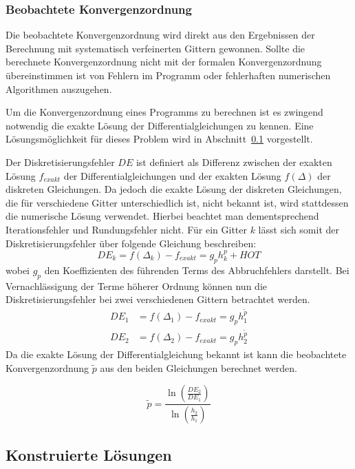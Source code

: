 \subsubsection{Beobachtete Konvergenzordnung}

Die beobachtete Konvergenzordnung wird direkt aus den Ergebnissen der Berechnung mit systematisch
verfeinerten Gittern gewonnen. Sollte die berechnete Konvergenzordnung nicht mit der formalen
Konvergenzordnung übereinstimmen ist von Fehlern im Programm oder fehlerhaften numerischen Algorithmen auszugehen.

Um die Konvergenzordnung eines Programms zu berechnen ist es zwingend notwendig die exakte Lösung der
Differentialgleichungen zu kennen. Eine Lösungsmöglichkeit für dieses Problem wird in Abschnitt~\ref{sec:man_sol}
vorgestellt.

Der Diskretisierungsfehler $DE$ ist definiert als Differenz zwischen der exakten Lösung $f_{exakt}$
der Differentialgleichungen und der exakten Lösung $f(\Delta)$ der diskreten Gleichungen.
Da jedoch die exakte Lösung der diskreten Gleichungen, die für verschiedene Gitter unterschiedlich ist,
nicht bekannt ist, wird stattdessen die numerische Lösung verwendet. Hierbei beachtet man dementsprechend
Iterationsfehler und Rundungsfehler nicht. Für ein Gitter $k$ lässt sich somit der Diskretisierungsfehler
über folgende Gleichung beschreiben:
\begin{equation*}
  DE_k=f(\Delta_k) - f_{exakt} = g_p h_k^p + HOT
\end{equation*}
wobei $g_p$ den Koeffizienten des führenden Terms des Abbruchfehlers darstellt.
Bei Vernachlässigung der Terme höherer Ordnung können nun die Diskretisierungsfehler bei
zwei verschiedenen Gittern betrachtet werden.
\begin{align*}
  DE_1 &= f(\Delta_1) - f_{exakt} = g_p h_1^{\tilde{p}}\\
  DE_2 &= f(\Delta_2) - f_{exakt} = g_p h_2^{\tilde{p}}
\end{align*}
Da die exakte Lösung der Differentialgleichung bekannt ist kann die beobachtete Konvergenzordnung
$\tilde{p}$ aus den beiden Gleichungen berechnet werden.

\begin{equation}
  \tilde{p}=\frac{\ln \left(\frac{DE_2}{DE_1}\right)}{\ln \left(\frac{h_2}{h_1}\right)}
\end{equation}


\subsection{Konstruierte Lösungen}
\label{sec:man_sol}

